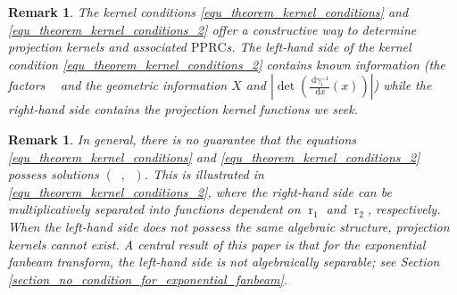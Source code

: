 \documentclass[12pt]{article}
\newtheorem{remark}[theorem]{Remark}
\DeclareMathOperator{\projvariable}{i}
\DeclareMathOperator{\Proj}{\mathcal{P}}
\newcommand{\dd}[1]{\,\mathrm{d}{#1}}
\newcommand{\rg}[1]{\mathrm{Rg}({#1})}
\DeclareMathOperator{\rayvariable}{r}
\DeclareMathOperator{\raygroundset}{R}
\DeclareMathOperator{\Vone}{V_1}
\DeclareMathOperator{\Vtwo}{V_2}
\newcommand{\conditionname}{$\mathrm{PPRC}$}
\DeclareMathOperator{\altweightfkt}{\tilde {\zeta}}
\DeclareMathOperator{\altrhoi}{\altweightfkt_{\projvariable}}
\begin{document}
\begin{remark}
The kernel conditions \eqref{equ_theorem_kernel_conditions} and \eqref{equ_theorem_kernel_conditions_2} offer a constructive way to determine projection kernels and associated \conditionname s. The left-hand side of the kernel condition \eqref{equ_theorem_kernel_conditions_2} contains known information (the factors $\altrhoi$ and the geometric information $X$ and $\left |\det\left( \frac{\dd { \gamma_{\projvariable}^{-1 }}}{\dd x}(x)\right)\right|$) while the right-hand side contains the projection kernel functions we seek.  %
\end{remark}

\begin{remark} \label{remark-nonexistence-algebraic}
In general, there is no guarantee that the equations \eqref{equ_theorem_kernel_conditions} and \eqref{equ_theorem_kernel_conditions_2} possess solutions $(\Vone,\Vtwo)$. This is illustrated in \eqref{equ_theorem_kernel_conditions_2}, where the right-hand side can be multiplicatively separated into functions dependent on $\rayvariable_1$ and $\rayvariable_2$, respectively. When the left-hand side does not possess the same algebraic structure, projection kernels cannot exist.
A central result of this paper is  that for the exponential fanbeam transform, the left-hand side is not algebraically separable; see Section \ref{section_no_condition_for_exponential_fanbeam}.
\end{remark}


\end{document}
